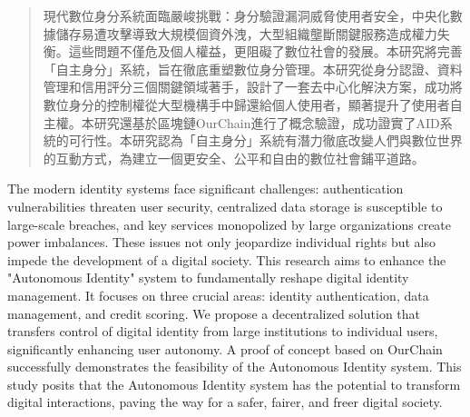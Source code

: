 
\begin{abstract}
  現代數位身分系統面臨嚴峻挑戰：身分驗證漏洞威脅使用者安全，中央化數據儲存易遭攻擊導致大規模個資外洩，大型組織壟斷關鍵服務造成權力失衡。這些問題不僅危及個人權益，更阻礙了數位社會的發展。本研究將完善「自主身分」系統，旨在徹底重塑數位身分管理。本研究從身分認證、資料管理和信用評分三個關鍵領域著手，設計了一套去中心化解決方案，成功將數位身分的控制權從大型機構手中歸還給個人使用者，顯著提升了使用者自主權。本研究還基於區塊鏈OurChain進行了概念驗證，成功證實了AID系統的可行性。本研究認為「自主身分」系統有潛力徹底改變人們與數位世界的互動方式，為建立一個更安全、公平和自由的數位社會鋪平道路。
\end{abstract}

\begin{abstract*}
  The modern identity systems face significant challenges: authentication vulnerabilities threaten user security, centralized data storage is susceptible to large-scale breaches, and key services monopolized by large organizations create power imbalances. These issues not only jeopardize individual rights but also impede the development of a digital society. This research aims to enhance the "Autonomous Identity" system to fundamentally reshape digital identity management. It focuses on three crucial areas: identity authentication, data management, and credit scoring. We propose a decentralized solution that transfers control of digital identity from large institutions to individual users, significantly enhancing user autonomy. A proof of concept based on OurChain successfully demonstrates the feasibility of the Autonomous Identity system. This study posits that the Autonomous Identity system has the potential to transform digital interactions, paving the way for a safer, fairer, and freer digital society.
\end{abstract*}